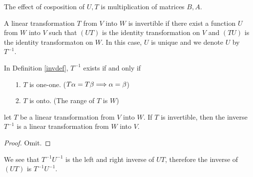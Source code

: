 \documentclass{mynotes}
\begin{document}
\begin{remark}
The effect of cosposition of $U,T$ is multiplication of matrices $B,A$.
\end{remark}
\begin{definition}[invertible]\label{invdef}
A linear transformation $T$ from $V$ into $W$ is invertible if there exist a function $U$ from $W$ into $V$ such that $(UT)$ is the identity transformation on $V$ and $(TU)$ is the identity transformaton on $W$. In this case, $U$ is unique and we denote $U$ by $T^{-1}$.
\end{definition}
\begin{remark}
In Definition \ref{invdef}, $T^{-1}$ exists if and only if
\begin{itemize}
	\item[1.] $T$ is one-one. ($T\alpha=T\beta\Longrightarrow \alpha=\beta$)
	\item[2.] $T$ is onto. (The range of $T$ is $W$)
\end{itemize}
\end{remark}
\begin{theorem}
let $T$ be a linear transformation from $V$ into $W$. If $T$ is invertible, then the inverse $T^{-1}$ is a linear transformation from $W$ into $V$.
\end{theorem}
\begin{proof}
Omit.
\end{proof}
\begin{remark}
We see that $T^{-1}U^{-1}$ is the left and right inverse of $UT$, therefore the inverse of $(UT)$ is $T^{-1}U^{-1}$.
\end{remark}
\end{document}
